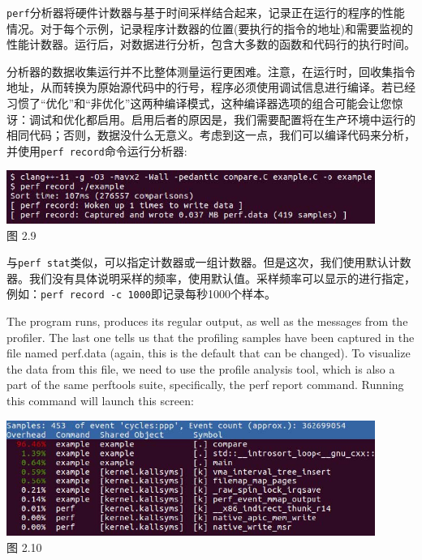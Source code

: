 
\texttt{perf}分析器将硬件计数器与基于时间采样结合起来，记录正在运行的程序的性能情况。对于每个示例，记录程序计数器的位置(要执行的指令的地址)和需要监视的性能计数器。运行后，对数据进行分析，包含大多数的函数和代码行的执行时间。

分析器的数据收集运行并不比整体测量运行更困难。注意，在运行时，回收集指令地址，从而转换为原始源代码中的行号，程序必须使用调试信息进行编译。若已经习惯了“优化”和“非优化”这两种编译模式，这种编译器选项的组合可能会让您惊讶：调试和优化都启用。启用后者的原因是，我们需要配置将在生产环境中运行的相同代码；否则，数据没什么无意义。考虑到这一点，我们可以编译代码来分析，并使用\texttt{perf record}命令运行分析器:

\begin{center}
\includegraphics[width=0.9\textwidth]{content/1/chapter2/images/9.jpg}\\
图 2.9
\end{center}

与\texttt{perf stat}类似，可以指定计数器或一组计数器。但是这次，我们使用默认计数器。我们没有具体说明采样的频率，使用默认值。采样频率可以显示的进行指定，例如：\texttt{perf record -c 1000}即记录每秒1000个样本。

The program runs, produces its regular output, as well as the messages from the profiler. The last one tells us that the profiling samples have been captured in the file named perf.data (again, this is the default that can be changed). To visualize the data from this file, we need to use the profile analysis tool, which is also a part of the same perftools suite, specifically, the perf report command. Running this command will launch this screen:

\begin{center}
\includegraphics[width=0.9\textwidth]{content/1/chapter2/images/10.jpg}\\
图 2.10
\end{center}


